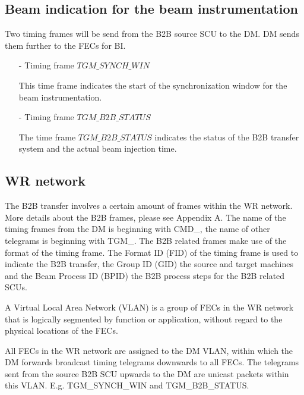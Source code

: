 \subsection{Beam indication for the beam instrumentation}

Two timing frames will be send from the B2B source SCU to the DM. DM sends them further to the FECs for BI.
\begin{itemize}
\item[-] Timing frame $TGM\_SYNCH\_WIN$

This time frame indicates the start of the synchronization window for the beam instrumentation.

\item[-] Timing frame $TGM\_B2B\_STATUS$

The time frame $TGM\_B2B\_STATUS$ indicates the status of the B2B transfer system and the actual beam injection time. 
\end{itemize}

\subsection{WR network}

The B2B transfer involves a certain amount of frames within the WR network. More details about the B2B frames, please see Appendix A. The name of the timing frames from the DM is beginning with CMD\_, the name of other telegrams is beginning with TGM\_. The B2B related frames make use of the format of the timing frame. The Format ID (\gls{FID}) of the timing frame is used to indicate the B2B transfer, the Group ID (\gls{GID}) the source and target machines and the Beam Process ID (\gls{BPID}) the B2B process steps for the B2B related SCUs. 

A Virtual Local Area Network (VLAN) is a group of FECs in the WR network that is logically segmented by function or application, without regard to the physical locations of the FECs. 

All FECs in the WR network are assigned to the DM VLAN, within which the DM forwards broadcast timing telegrams downwards to all FECs. The telegrams sent from the source B2B SCU upwards to the DM are unicast packets within this VLAN. E.g. TGM\_SYNCH\_WIN and TGM\_B2B\_STATUS. 

